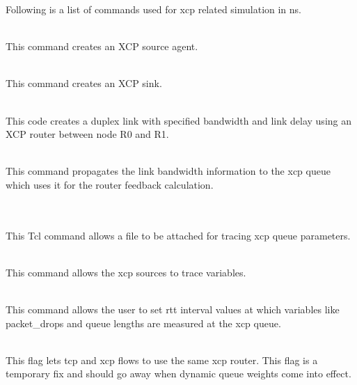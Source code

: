   Following is a list of commands used for xcp related simulation in ns.
  \begin{flushleft}

    \\
    This command creates an XCP source agent.

    \\
    This command creates an XCP sink.

    \\
    This code creates a duplex link with specified bandwidth and link
    delay using an XCP router between node R0 and R1.

    \\
    This command propagates the link bandwidth information to the xcp
    queue which uses it for the router feedback calculation.

     \\
     \\
    This Tcl command allows a file to be attached for tracing xcp queue
    parameters. 
    
    \\
    This command allows the xcp sources to trace variables.
    
    \\ %
    This command allows the user to set rtt interval values at which
    variables like packet\_drops and queue lengths are measured at the
    xcp queue.

    \\
    This flag lets tcp and xcp flows to use the same xcp router. This
    flag is a temporary fix and should go away when dynamic queue
    weights come into effect.
    
  \end{flushleft}
